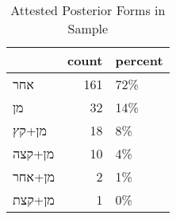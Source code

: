 \begin{table}[htbp!]
\centering
\caption{Attested Posterior Forms in Sample}
\label{table:post_front}
\begin{tabular}{lrl}
\toprule
{} &  count & percent \\
\midrule
\texthebrew{אחר}    &    161 &     72\% \\
\texthebrew{מן}     &     32 &     14\% \\
\texthebrew{מן+קץ}  &     18 &      8\% \\
\texthebrew{מן+קצה} &     10 &      4\% \\
\texthebrew{מן+אחר} &      2 &      1\% \\
\texthebrew{מן+קצת} &      1 &      0\% \\
\bottomrule
\end{tabular}
\end{table}

